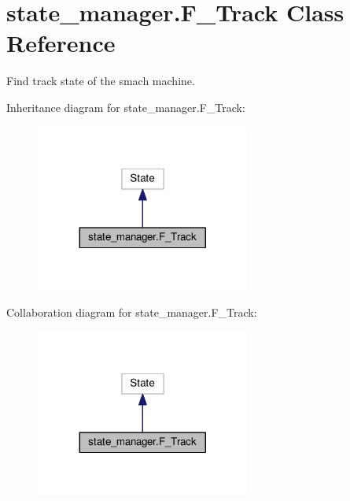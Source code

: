 \hypertarget{classstate__manager_1_1F__Track}{}\section{state\+\_\+manager.\+F\+\_\+\+Track Class Reference}
\label{classstate__manager_1_1F__Track}


Find track state of the smach machine.  




Inheritance diagram for state\+\_\+manager.\+F\+\_\+\+Track\+:\nopagebreak
\begin{figure}[H]
\begin{center}
\leavevmode
\includegraphics[width=200pt]{classstate__manager_1_1F__Track__inherit__graph}
\end{center}
\end{figure}


Collaboration diagram for state\+\_\+manager.\+F\+\_\+\+Track\+:\nopagebreak
\begin{figure}[H]
\begin{center}
\leavevmode
\includegraphics[width=200pt]{classstate__manager_1_1F__Track__coll__graph}
\end{center}
\end{figure}
